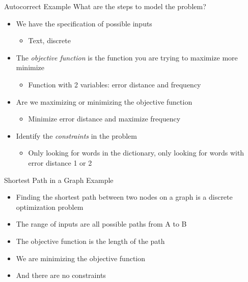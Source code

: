 \documentclass[
  ignorenonframetext,
]{beamer}
\providecommand{\tightlist}{%
  \setlength{\itemsep}{0pt}\setlength{\parskip}{0pt}}\usepackage{longtable,booktabs,array}
\begin{document}
\begin{frame}{Autocorrect Example}
\protect\hypertarget{autocorrect-example-2}{}
What are the steps to model the problem?

\begin{itemize}
\item
  We have the specification of possible inputs

  \begin{itemize}
  \tightlist
  \item
    Text, discrete
  \end{itemize}
\item
  The \emph{objective function} is the function you are trying to
  maximize more minimize

  \begin{itemize}
  \tightlist
  \item
    Function with 2 variables: error distance and frequency
  \end{itemize}
\item
  Are we maximizing or minimizing the objective function

  \begin{itemize}
  \tightlist
  \item
    Minimize error distance and maximize frequency
  \end{itemize}
\item
  Identify the \emph{constraints} in the problem

  \begin{itemize}
  \tightlist
  \item
    Only looking for words in the dictionary, only looking for words
    with error distance 1 or 2
  \end{itemize}
\end{itemize}
\end{frame}

\begin{frame}{Shortest Path in a Graph Example}
\protect\hypertarget{shortest-path-in-a-graph-example}{}
\begin{itemize}
\item
  Finding the shortest path between two nodes on a graph is a discrete
  optimization problem
\item
  The range of inputs are all possible paths from A to B
\item
  The objective function is the length of the path
\item
  We are minimizing the objective function
\item
  And there are no constraints
\end{itemize}
\end{frame}
\end{document}

